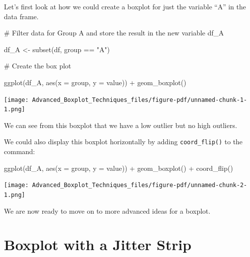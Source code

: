 \documentclass[
  letterpaper,
  DIV=11,
  numbers=noendperiod]{scrreprt}
\newenvironment{Shaded}{\begin{snugshade}}{\end{snugshade}}
\newcommand{\AttributeTok}[1]{\textcolor[rgb]{0.40,0.45,0.13}{#1}}
\newcommand{\CommentTok}[1]{\textcolor[rgb]{0.37,0.37,0.37}{#1}}
\newcommand{\FunctionTok}[1]{\textcolor[rgb]{0.28,0.35,0.67}{#1}}
\newcommand{\NormalTok}[1]{\textcolor[rgb]{0.00,0.23,0.31}{#1}}
\newcommand{\OtherTok}[1]{\textcolor[rgb]{0.00,0.23,0.31}{#1}}
\newcommand{\SpecialCharTok}[1]{\textcolor[rgb]{0.37,0.37,0.37}{#1}}
\newcommand{\StringTok}[1]{\textcolor[rgb]{0.13,0.47,0.30}{#1}}
\begin{document}
Let's first look at how we could create a boxplot for just the variable
``A'' in the data frame.

\begin{Shaded}
\begin{Highlighting}[]
\CommentTok{\# Filter data for Group A and store the result in the new variable df\_A}

\NormalTok{df\_A }\OtherTok{\textless{}{-}} \FunctionTok{subset}\NormalTok{(df, group }\SpecialCharTok{==} \StringTok{"A"}\NormalTok{)}

\CommentTok{\# Create the box plot}

\FunctionTok{ggplot}\NormalTok{(df\_A, }\FunctionTok{aes}\NormalTok{(}\AttributeTok{x =}\NormalTok{ group, }\AttributeTok{y =}\NormalTok{ value)) }\SpecialCharTok{+}
  \FunctionTok{geom\_boxplot}\NormalTok{()}
\end{Highlighting}
\end{Shaded}

\begin{center}
\texttt{[image: Advanced\_Boxplot\_Techniques\_files/figure-pdf/unnamed-chunk-1-1.png]}
\end{center}

We can see from this boxplot that we have a low outlier but no high
outliers.

We could also display this boxplot horizontally by adding
\texttt{coord\_flip()} to the command:

\begin{Shaded}
\begin{Highlighting}[]
\FunctionTok{ggplot}\NormalTok{(df\_A, }\FunctionTok{aes}\NormalTok{(}\AttributeTok{x =}\NormalTok{ group, }\AttributeTok{y =}\NormalTok{ value)) }\SpecialCharTok{+}
  \FunctionTok{geom\_boxplot}\NormalTok{() }\SpecialCharTok{+}
  \FunctionTok{coord\_flip}\NormalTok{()}
\end{Highlighting}
\end{Shaded}

\begin{center}
\texttt{[image: Advanced\_Boxplot\_Techniques\_files/figure-pdf/unnamed-chunk-2-1.png]}
\end{center}

We are now ready to move on to more advanced ideas for a boxplot.

\section*{Boxplot with a Jitter
Strip}\label{boxplot-with-a-jitter-strip}
\end{document}
